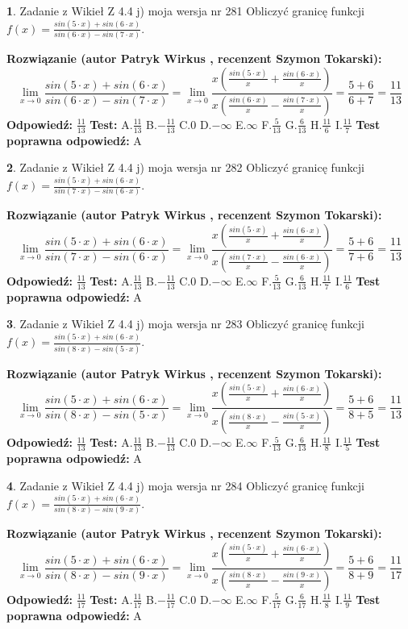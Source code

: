 \documentclass[12pt, a4paper]{article}
\theoremstyle{definition} %
\newtheorem{zad}{}
\newcommand{\zadStart}[1]{\begin{zad}#1\newline}
\newcommand{\zadStop}{\end{zad}}
\newcommand{\rozwStart}[2]{\noindent \textbf{Rozwiązanie (autor #1 , recenzent #2): }\newline}
\newcommand{\rozwStop}{\newline}
\newcommand{\odpStart}{\noindent \textbf{Odpowiedź:}\newline}
\newcommand{\odpStop}{\newline}
\newcommand{\testStart}{\noindent \textbf{Test:}\newline}
\newcommand{\testStop}{\newline}
\newcommand{\kluczStart}{\noindent \textbf{Test poprawna odpowiedź:}\newline}
\newcommand{\kluczStop}{\newline}
\begin{document}
\zadStart{Zadanie z Wikieł Z 4.4 j) moja wersja nr 281}
Obliczyć granicę funkcji $f(x)=\frac{sin(5\cdot x) +sin(6\cdot x)}{sin(6\cdot x) -sin(7\cdot x)}$.
\zadStop
\rozwStart{Patryk Wirkus}{Szymon Tokarski}
$$\lim\limits_{x\to 0}\frac{sin(5\cdot x) +sin(6\cdot x)}{sin(6\cdot x) -sin(7\cdot x)}=\lim\limits_{x\to 0}\frac{x(\frac{sin(5\cdot x)}{x}+\frac{sin(6\cdot x)}{x})}{x(\frac{sin(6\cdot x)}{x}-\frac{sin(7\cdot x)}{x})}=\frac{5+6}{6+7} = \frac{11}{13}$$
\rozwStop
\odpStart
$\frac{11}{13}$
\odpStop
\testStart
A.$\frac{11}{13}$
B.$-\frac{11}{13}$
C.$0$
D.$-\infty$
E.$\infty$
F.$\frac{5}{13}$
G.$\frac{6}{13}$
H.$\frac{11}{6}$
I.$\frac{11}{7}$
\testStop
\kluczStart
A
\kluczStop



\zadStart{Zadanie z Wikieł Z 4.4 j) moja wersja nr 282}
Obliczyć granicę funkcji $f(x)=\frac{sin(5\cdot x) +sin(6\cdot x)}{sin(7\cdot x) -sin(6\cdot x)}$.
\zadStop
\rozwStart{Patryk Wirkus}{Szymon Tokarski}
$$\lim\limits_{x\to 0}\frac{sin(5\cdot x) +sin(6\cdot x)}{sin(7\cdot x) -sin(6\cdot x)}=\lim\limits_{x\to 0}\frac{x(\frac{sin(5\cdot x)}{x}+\frac{sin(6\cdot x)}{x})}{x(\frac{sin(7\cdot x)}{x}-\frac{sin(6\cdot x)}{x})}=\frac{5+6}{7+6} = \frac{11}{13}$$
\rozwStop
\odpStart
$\frac{11}{13}$
\odpStop
\testStart
A.$\frac{11}{13}$
B.$-\frac{11}{13}$
C.$0$
D.$-\infty$
E.$\infty$
F.$\frac{5}{13}$
G.$\frac{6}{13}$
H.$\frac{11}{7}$
I.$\frac{11}{6}$
\testStop
\kluczStart
A
\kluczStop



\zadStart{Zadanie z Wikieł Z 4.4 j) moja wersja nr 283}
Obliczyć granicę funkcji $f(x)=\frac{sin(5\cdot x) +sin(6\cdot x)}{sin(8\cdot x) -sin(5\cdot x)}$.
\zadStop
\rozwStart{Patryk Wirkus}{Szymon Tokarski}
$$\lim\limits_{x\to 0}\frac{sin(5\cdot x) +sin(6\cdot x)}{sin(8\cdot x) -sin(5\cdot x)}=\lim\limits_{x\to 0}\frac{x(\frac{sin(5\cdot x)}{x}+\frac{sin(6\cdot x)}{x})}{x(\frac{sin(8\cdot x)}{x}-\frac{sin(5\cdot x)}{x})}=\frac{5+6}{8+5} = \frac{11}{13}$$
\rozwStop
\odpStart
$\frac{11}{13}$
\odpStop
\testStart
A.$\frac{11}{13}$
B.$-\frac{11}{13}$
C.$0$
D.$-\infty$
E.$\infty$
F.$\frac{5}{13}$
G.$\frac{6}{13}$
H.$\frac{11}{8}$
I.$\frac{11}{5}$
\testStop
\kluczStart
A
\kluczStop



\zadStart{Zadanie z Wikieł Z 4.4 j) moja wersja nr 284}
Obliczyć granicę funkcji $f(x)=\frac{sin(5\cdot x) +sin(6\cdot x)}{sin(8\cdot x) -sin(9\cdot x)}$.
\zadStop
\rozwStart{Patryk Wirkus}{Szymon Tokarski}
$$\lim\limits_{x\to 0}\frac{sin(5\cdot x) +sin(6\cdot x)}{sin(8\cdot x) -sin(9\cdot x)}=\lim\limits_{x\to 0}\frac{x(\frac{sin(5\cdot x)}{x}+\frac{sin(6\cdot x)}{x})}{x(\frac{sin(8\cdot x)}{x}-\frac{sin(9\cdot x)}{x})}=\frac{5+6}{8+9} = \frac{11}{17}$$
\rozwStop
\odpStart
$\frac{11}{17}$
\odpStop
\testStart
A.$\frac{11}{17}$
B.$-\frac{11}{17}$
C.$0$
D.$-\infty$
E.$\infty$
F.$\frac{5}{17}$
G.$\frac{6}{17}$
H.$\frac{11}{8}$
I.$\frac{11}{9}$
\testStop
\kluczStart
A
\kluczStop
\end{document}
